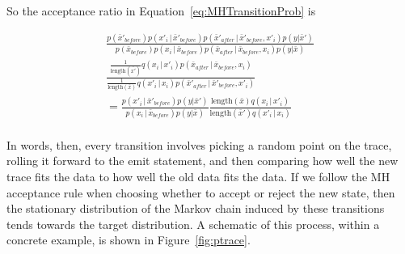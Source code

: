 \documentclass{article}
\newcommand{\given}{\, |\,}
\begin{document}
So the acceptance ratio in Equation~\ref{eq:MHTransitionProb} is

\begin{align}
\frac{p(\bar{x}'_{before}) p(x'_i \given \bar{x}'_{before})
                    p(\bar{x}'_{after} \given \bar{x}'_{before}, x'_i)
                   p(y|\bar{x}')}
                   {p(\bar{x}_{before}) p(x_i \given \bar{x}_{before})
                    p(\bar{x}_{after} \given \bar{x}_{before}, x_i)
                    p(y|\bar{x})}\\
\frac{\frac{1}{\text{length}(\bar{x'})} 
                           q(x_i \given x'_i) p(\bar{x}_{after} \given \bar{x}_{before}, x_i)
                        }{\frac{1}{\text{length}(\bar{x})} 
                           q(x'_i \given x_i) p(\bar{x}'_{after} \given
                           \bar{x}'_{before}, x'_i)}\\
= \frac{p(x'_i \given \bar{x}'_{before})
        p(y|\bar{x}')}
{p(x_i \given \bar{x}_{before})
 p(y|\bar{x})}
\frac{\text{length}(\bar{x})
    q(x_i \given x'_i) }
    {\text{length}(\bar{x}') 
    q(x'_i \given x_i)}\\
\end{align}

In words, then, every transition involves picking a random point on the trace,
rolling it forward to the emit statement, and then comparing how well the new
trace fits the data to how well the old data fits the data. If we follow the MH
acceptance rule when choosing whether to accept or reject the new state, then
the stationary distribution of the Markov chain induced by these transitions
tends towards the target distribution.  A schematic of this process, within a
concrete example, is shown in Figure~\ref{fig:ptrace}.  
\end{document}
